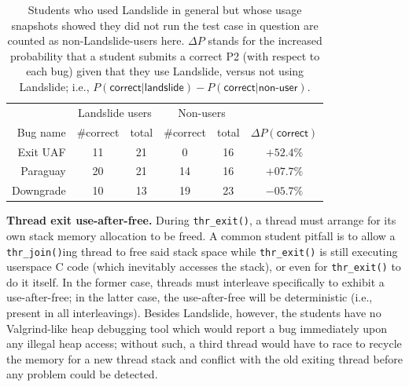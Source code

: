 \begin{table}[h]
	\begin{center}
	\begin{tabular}{r||cc|cc|c}
		& \multicolumn{2}{c|}{Landslide users} & \multicolumn{2}{c|}{Non-users} & \\
		Bug name & \#correct & total & \#correct & total & $\Delta P(\mathsf{correct})$ \\
		\hline
		Exit UAF  & 11	& 21	& 0	& 16	& $+52.4\%$ \\
		Paraguay  & 20	& 21	& 14	& 16	& $+07.7\%$ \\
		Downgrade & 10	& 13	& 19	& 23	& $-05.7\%$ \\
	\end{tabular}
	\end{center}
	\caption{
		Students who used Landslide in general but whose usage snapshots showed they did not run the test case in question are counted as non-Landslide-users here.
		$\Delta P$ stands for the increased probability that a student submits a correct P2
		(with respect to each bug)
		given that they use Landslide, versus not using Landslide; i.e.,
		$P(\mathsf{correct}|\mathsf{landslide})-
		P(\mathsf{correct}|\mathsf{non\text{-}user})$.
		}
	\label{tab:eval-common-bugs}
\end{table}

{\bf Thread exit use-after-free.}
During {\tt thr\_exit()}, a thread must arrange for its own stack memory allocation to be freed.
A common student pitfall is to allow a {\tt thr\_join()}ing thread to free said stack space
while {\tt thr\_exit()} is still executing userspace C code (which inevitably accesses the stack),
or even for {\tt thr\_exit()} to do it itself.
In the former case, threads must interleave specifically to exhibit a use-after-free;
in the latter case, the use-after-free will be deterministic (i.e., present in all interleavings).
Besides Landslide, however,
the students have no Valgrind-like heap debugging tool which would report a bug immediately upon any illegal heap access;
without such, a third thread would have to race to recycle the memory for a new thread stack
and conflict with the old exiting thread
before any problem could be detected.


